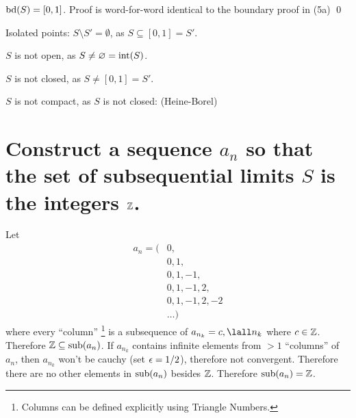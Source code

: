 \documentclass[10pt, letterpaper, titlepage]{article}
\begin{document}
\begin{multicols}{2}
          $\textrm{bd}(S) = [0,1]$.
          Proof is word-for-word identical to the boundary proof in (5a)
          \qed
          
            Isolated points: 
            $S \setminus S' = \emptyset$, as $S \subseteq [0,1] = S'$. 

            $S$ is not open, as $S \neq \varnothing = \textrm{int}(S)$. 

            $S$ is not closed, as $S \neq [0,1] = S'$.

            $S$ is not compact, as $S$ is not closed: (Heine-Borel)
        \end{multicols}

    \section{Construct a sequence $a_n$ so that the set of subsequential limits $S$ is the integers $\mathbb{Z}$.}
    Let
    \begin{align*}
      a_n = (&0,\\
        &0,1,\\
        &0,1,-1,\\
        &0,1,-1,2,\\
        &0,1,-1,2,-2 \\
        &\hdots)
    \end{align*}
    where every ``column''
    \footnote{Columns can be defined explicitly using Triangle Numbers.}
    is a subsequence of $a_{n_k} = c, \lall n_k$ where $c \in \mathbb{Z}$. 
    Therefore $\mathbb{Z} \subseteq \textrm{sub}(a_n)$.
    If $a_{n_k}$ contains infinite elements from $> 1$ ``columns'' of $a_n$,
    then $a_{n_k}$ won't be cauchy (set $\epsilon = 1/2$), therefore not convergent.
    Therefore there are no other elements in $\textrm{sub}(a_n)$ besides $\mathbb{Z}$.
    Therefore $\textrm{sub}(a_n) = \mathbb{Z}$.
    
\end{document}
